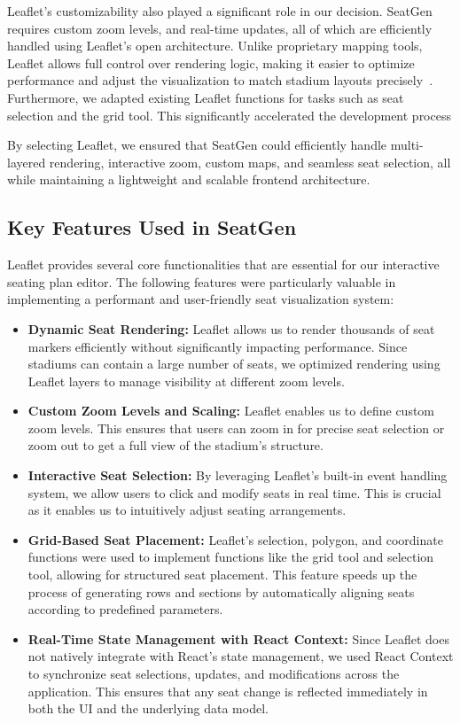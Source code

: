 Leaflet’s customizability also played a significant role in our decision. SeatGen requires custom zoom levels, and real-time updates, all of which are efficiently handled using Leaflet’s open architecture. Unlike proprietary mapping tools, Leaflet allows full control over rendering logic, making it easier to optimize performance and adjust the visualization to match stadium layouts precisely~\cite{Leaflet}. Furthermore, we adapted existing Leaflet functions for tasks such as seat selection and the grid tool. This significantly accelerated the development process

By selecting Leaflet, we ensured that SeatGen could efficiently handle multi-layered rendering, interactive zoom, custom maps, and seamless seat selection, all while maintaining a lightweight and scalable frontend architecture.

\subsection{Key Features Used in SeatGen}

Leaflet provides several core functionalities that are essential for our interactive seating plan editor. The following features were particularly valuable in implementing a performant and user-friendly seat visualization system:

\begin{itemize}
    \item \textbf{Dynamic Seat Rendering:} Leaflet allows us to render thousands of seat markers efficiently without significantly impacting performance. Since stadiums can contain a large number of seats, we optimized rendering using Leaflet layers to manage visibility at different zoom levels.
    \item \textbf{Custom Zoom Levels and Scaling:} Leaflet enables us to define custom zoom levels. This ensures that users can zoom in for precise seat selection or zoom out to get a full view of the stadium’s structure.
    \item \textbf{Interactive Seat Selection:} By leveraging Leaflet’s built-in event handling system, we allow users to click and modify seats in real time. This is crucial as it enables us to intuitively adjust seating arrangements.
    \item \textbf{Grid-Based Seat Placement:} Leaflet’s selection, polygon, and coordinate functions were used to implement functions like the grid tool and selection tool, allowing for structured seat placement. This feature speeds up the process of generating rows and sections by automatically aligning seats according to predefined parameters.
    \item \textbf{Real-Time State Management with React Context:} Since Leaflet does not natively integrate with React’s state management, we used React Context to synchronize seat selections, updates, and modifications across the application. This ensures that any seat change is reflected immediately in both the UI and the underlying data model.
\end{itemize}


